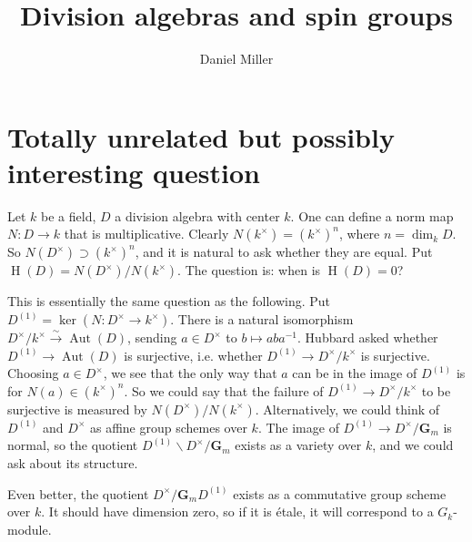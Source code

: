 \documentclass{article}
\title{Division algebras and spin groups}
\author{Daniel Miller}
\newcommand{\dG}{\mathbf{G}}
\begin{document}
\maketitle


\section{Totally unrelated but possibly interesting question}

Let $k$ be a field, $D$ a division algebra with center $k$. One can define a 
norm map $N:D\to k$ that is multiplicative. Clearly 
$N(k^\times) = (k^\times)^n$, where $n=\dim_k D$. So 
$N(D^\times)\supset (k^\times)^n$, and it is natural to ask 
whether they are equal. Put 
$\operatorname{H}(D) = N(D^\times) / N(k^\times)$. 
The question is: when is $\operatorname{H}(D)=0$?

This is essentially the same question as the following. Put 
$D^{(1)}=\ker(N:D^\times \to k^\times)$. There is a natural isomorphism 
$D^\times / k^\times \xrightarrow\sim \operatorname{Aut}(D)$, sending 
$a\in D^\times$ to $b\mapsto a b a^{-1}$. Hubbard asked whether 
$D^{(1)} \to \operatorname{Aut}(D)$ is surjective, i.e. whether 
$D^{(1)} \to D^\times / k^\times$ is surjective. Choosing $a\in D^\times$, we 
see that the only way that $a$ can be in the image of 
$D^{(1)}$ is for $N(a)\in (k^\times)^n$. So we could say that the failure of 
$D^{(1)} \to D^\times / k^\times$ to be surjective is measured by 
$N(D^\times) / N(k^\times)$. Alternatively, we could think of 
$D^{(1)}$ and $D^\times$ as affine group schemes over $k$. The image of 
$D^{(1)} \to D^\times / \dG_m$ is normal, so the quotient 
$D^{(1)}\backslash D^\times / \dG_m$ exists as a variety over $k$, and we could 
ask about its structure. 

Even better, the quotient $D^\times / \dG_m D^{(1)}$ exists as a commutative 
group scheme over $k$. It should have dimension zero, so if it is \'etale, 
it will correspond to a $G_k$-module. 
\end{document}
